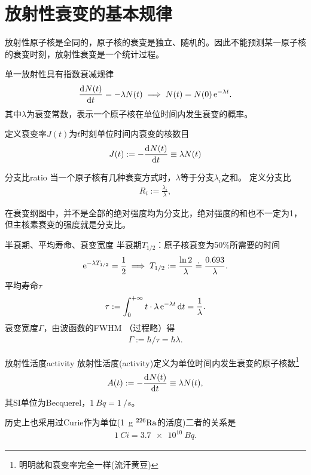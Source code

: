 \section{放射性衰变的基本规律}

放射性原子核是全同的，原子核的衰变是独立、随机的。因此不能预测某一原子核的衰变时刻，放射性衰变是一个统计过程。

单一放射性具有指数衰减规律
\begin{align}
	\frac{\mathrm{d}^{{}}N(t)}{\mathrm{d}{t}^{{}}}=-\lambda N(t)\implies N(t)=N(0)\mathop{}\!\mathrm{e}^{-\lambda t}.
\end{align}
其中$\lambda$为衰变常数，表示一个原子核在单位时间内发生衰变的概率。

定义衰变率$J(t)$为$t$时刻单位时间内衰变的核数目
\[
	J(t):=-\frac{\mathrm{d}^{{}}N(t)}{\mathrm{d}{t}^{{}}}\equiv\lambda N(t)
\]
\begin{definition}{分支比}{ratio}
	当一个原子核有几种衰变方式时，$\lambda$等于分支$\lambda_i$之和。
	定义分支比
	\begin{align}
		R_i:=\frac{\lambda_i}\lambda,
	\end{align}
\end{definition}
在衰变纲图中，并不是全部的绝对强度均为分支比，绝对强度的和也不一定为1，但主核素衰变的强度就是分支比。
\begin{definition}{半衰期、平均寿命、衰变宽度}{}
	半衰期$T_{1/2}$：原子核衰变为50\%所需要的时间
	\begin{align}
		\mathop{}\!\mathrm{e}^{-\lambda T_{1/2}}=\frac12\implies T_{1/2}:=\frac{\ln 2}\lambda\doteq\frac{0.693}\lambda.
	\end{align}
	平均寿命$\tau$
	\begin{align}
		\tau:=\int_0^{+\infty} t\cdot\lambda\mathop{}\!\mathrm{e}^{-\lambda t}\mathop{}\!\mathrm{d} t=\frac1\lambda.
	\end{align}
	衰变宽度$\varGamma$，由波函数的FWHM （过程略）得
	\begin{align}
		\varGamma:=\hbar/\tau=\hbar\lambda.
	\end{align}
\end{definition}
\begin{definition}{放射性活度}{activity}
	放射性活度(activity)定义为单位时间内发生衰变的原子核数\footnote{明明就和衰变率完全一样(流汗黄豆)}
	\begin{align}
		A(t):=-\frac{\mathrm{d}^{{}}N(t)}{\mathrm{d}{t}^{{}}}\equiv\lambda N(t),
	\end{align}
	其SI单位为Becquerel，$\SI{1}{Bq}=\SI{1}{\per s}$。
\end{definition}
历史上也采用过Curie作为单位(\SI{1}{g} ${^{226}\mathrm{Ra}}$的活度)二者的关系是
\begin{align}
	\SI{1}{Ci}=\SI{3.7e10}{Bq}.
\end{align}


